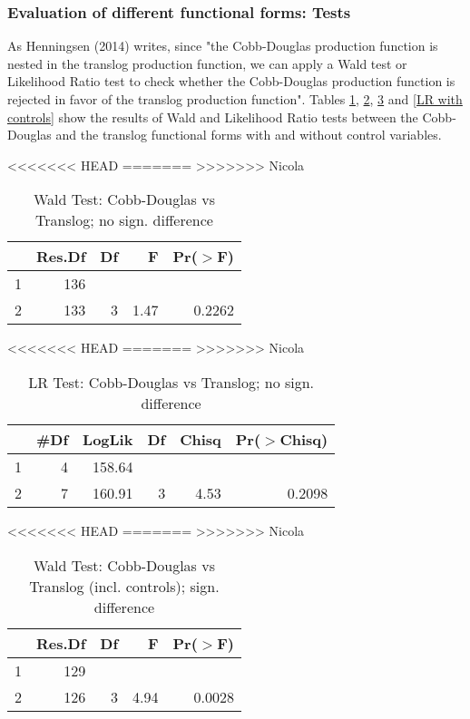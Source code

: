 \documentclass[12pt,a4paper]{article}\usepackage[]{graphicx}\usepackage[]{color}
\begin{document}
\subsubsection{Evaluation of different functional forms: Tests}
As Henningsen (2014) writes, since "the Cobb-Douglas production function is nested in the translog production function, we can apply a Wald test or Likelihood Ratio test to check whether the Cobb-Douglas production function is rejected in favor of the translog production function". Tables \ref{WT}, \ref{LR}, \ref{WT with controls} and \ref{LR with controls} show the results of Wald and Likelihood Ratio tests between the Cobb-Douglas and the translog functional forms with and without control variables. 

<<<<<<< HEAD
=======
>>>>>>> Nicola
\begin{table}[ht]
\centering
\caption{Wald Test: Cobb-Douglas vs Translog; no sign. difference} 
\label{WT}
\begin{tabular}{lrrrr}
  \hline
 & Res.Df & Df & F & Pr($>$F) \\ 
  \hline
1 & 136 &  &  &  \\ 
  2 & 133 & 3 & 1.47 & 0.2262 \\ 
   \hline
\end{tabular}
\end{table}
<<<<<<< HEAD
=======
>>>>>>> Nicola
\begin{table}[ht]
\centering
\caption{LR Test: Cobb-Douglas vs Translog; no sign. difference} 
\label{LR}
\begin{tabular}{lrrrrr}
  \hline
 & \#Df & LogLik & Df & Chisq & Pr($>$Chisq) \\ 
  \hline
1 & 4 & 158.64 &  &  &  \\ 
  2 & 7 & 160.91 & 3 & 4.53 & 0.2098 \\ 
   \hline
\end{tabular}
\end{table}
<<<<<<< HEAD
=======
>>>>>>> Nicola
\begin{table}[ht]
\centering
\caption{Wald Test: Cobb-Douglas vs Translog (incl. controls); sign. difference} 
\label{WT with controls}
\begin{tabular}{lrrrr}
  \hline
 & Res.Df & Df & F & Pr($>$F) \\ 
  \hline
1 & 129 &  &  &  \\ 
  2 & 126 & 3 & 4.94 & 0.0028 \\ 
   \hline
\end{tabular}
\end{table}
\end{document}
